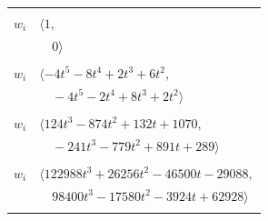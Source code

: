 \documentclass[11pt]{article}
\begin{document}
\begin{longtable}{@{}ll@{}}
\addlinespace[2pt]
\multicolumn{2}{@{}p{0.97\textwidth}@{}}{$i=94$, $D_i=1$, $\rho_{ij}$: $--$}\\
$w_i$ & $\langle 1,$\\
 & $\quad 0\rangle$\\
\addlinespace[2pt]
\multicolumn{2}{@{}p{0.97\textwidth}@{}}{$i=95$, $D_i=1$, $\rho_{ij}$: $0{:}1, \allowbreak 1{:}1, \allowbreak 2{:}2, \allowbreak 4{:}1, \allowbreak 16{:}1, \allowbreak 27{:}2, \allowbreak 51{:}2, \allowbreak 60{:}2, \allowbreak 82{:}1$}\\
$w_i$ & $\langle -4t^{5}-8t^{4}+2t^{3}+6t^{2},$\\
 & $\quad -4t^{5}-2t^{4}+8t^{3}+2t^{2}\rangle$\\
\addlinespace[2pt]
\multicolumn{2}{@{}p{0.97\textwidth}@{}}{$i=96$, $D_i=1$, $\rho_{ij}$: $3{:}1, \allowbreak 16{:}2, \allowbreak 17{:}1, \allowbreak 19{:}1, \allowbreak 36{:}1, \allowbreak 50{:}2, \allowbreak 56{:}2, \allowbreak 65{:}1, \allowbreak 71{:}2, \allowbreak 74{:}2, \allowbreak 76{:}1, \allowbreak 97{:}2$}\\
$w_i$ & $\langle 124t^{3}-874t^{2}+132t+1070,$\\
 & $\quad -241t^{3}-779t^{2}+891t+289\rangle$\\
\addlinespace[2pt]
\multicolumn{2}{@{}p{0.97\textwidth}@{}}{$i=97$, $D_i=1$, $\rho_{ij}$: $1{:}2, \allowbreak 4{:}2, \allowbreak 5{:}2, \allowbreak 19{:}1, \allowbreak 26{:}1, \allowbreak 34{:}2, \allowbreak 42{:}1, \allowbreak 51{:}1, \allowbreak 60{:}1, \allowbreak 69{:}2, \allowbreak 72{:}2, \allowbreak 76{:}1, \allowbreak 89{:}2, \allowbreak 96{:}1$}\\
$w_i$ & $\langle 122988t^{3}+26256t^{2}-46500t-29088,$\\
 & $\quad 98400t^{3}-17580t^{2}-3924t+62928\rangle$\\
\addlinespace[2pt]
\end{longtable}
\endgroup
\end{document}
